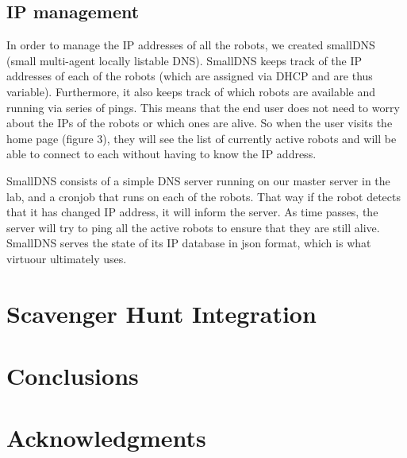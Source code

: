 \documentclass{sig-alternate-05-2015}
\begin{document}
\subsection{IP management}

In order to manage the IP addresses of all the robots, we created smallDNS
(small multi-agent locally listable DNS). SmallDNS keeps track of the IP
addresses of each of the robots (which are assigned via DHCP and are thus
variable). Furthermore, it also keeps track of which robots are available and
running via series of pings. This means that the end user does not need to
worry about the IPs of the robots or which ones are alive. So when the user
visits the home page (figure 3), they will see the list of currently active
robots and will be able to connect to each without having to know the IP
address.

SmallDNS consists of a simple DNS server running on our master server in the
lab, and a cronjob that runs on each of the robots. That way if the robot
detects that it has changed IP address, it will inform the server. As time
passes, the server will try to ping all the active robots to ensure that they
are still alive. SmallDNS serves the state of its IP database in json
format, which is what virtuour ultimately uses.

\section{Scavenger Hunt Integration}

\section{Conclusions}

\section{Acknowledgments}


\end{document}
